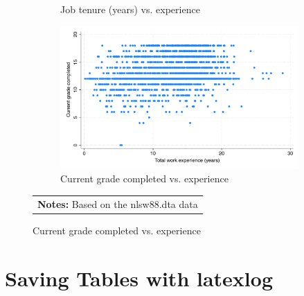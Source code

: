 \documentclass{article}
\begin{document}
\begin{figure}[H]
\begin{subfigure}{.45\textwidth}
  \caption{Job tenure (years) vs. experience}
\end{subfigure}
\begin{subfigure}{.45\textwidth}
  \includegraphics[width = 1.00\textwidth]{./figures/scatter_grade.pdf}  
  \caption{Current grade completed vs. experience}
\end{subfigure}
\begin{tabular}{p{6in}}  
 \footnotesize \vspace{2pt} 
 \textbf{Notes:} Based on the nlsw88.dta data 
\end{tabular} 
\end{figure} 
\clearpage\pagebreak
\section{Saving Tables with latexlog}
\end{document}
